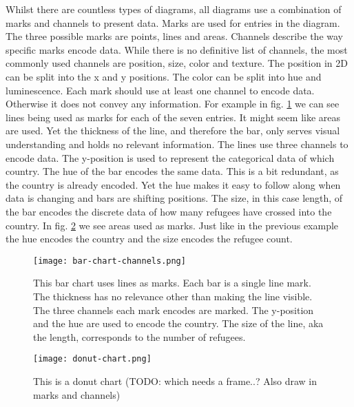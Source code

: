 Whilst there are countless types of diagrams, all diagrams use a combination of marks and channels to present data. Marks are used for entries in the diagram. The three possible marks are points, lines and areas. Channels describe the way specific marks encode data. While there is no definitive list of channels, the most commonly used channels are position, size, color and texture. The position in 2D can be split into the x and y positions. The color can be split into hue and luminescence. Each mark should use at least one channel to encode data. Otherwise it does not convey any information. For example in fig. \ref{fig:bar-chart} we can see lines being used as marks for each of the seven entries. It might seem like areas are used. Yet the thickness of the line, and therefore the bar, only serves visual understanding and holds no relevant information. The lines use three channels to encode data. The y-position is used to represent the categorical data of which country. The hue of the bar encodes the same data. This is a bit redundant, as the country is already encoded. Yet the hue makes it easy to follow along when data is changing and bars are shifting positions. The size, in this case length, of the bar encodes the discrete data of how many refugees have crossed into the country. In fig. \ref{fig:donut-chart} we see areas used as marks. Just like in the previous example the hue encodes the country and the size encodes the refugee count. 

\begin{figure}
    \texttt{[image: bar-chart-channels.png]}
    \captionsetup{width=0.9\textwidth}
    \caption[bar-chart]{This bar chart uses lines as marks. Each bar is a single line mark. The thickness has no relevance other than making the line visible. The three channels each mark encodes are marked. The y-position and the hue are used to encode the country. The size of the line, aka the length, corresponds to the number of refugees.}
    \label{fig:bar-chart}
\end{figure}

\begin{figure}
    \texttt{[image: donut-chart.png]}
    \captionsetup{width=0.9\textwidth}
    \caption[donut-chart]{This is a donut chart (TODO: which needs a frame..? Also draw in marks and channels)}
    \label{fig:donut-chart}
\end{figure}

